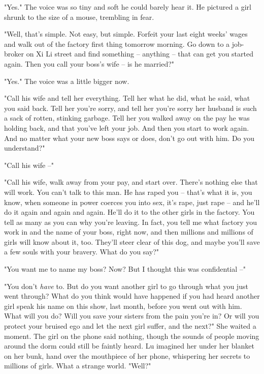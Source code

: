 "Yes." The voice was so tiny and soft he could barely hear it. He
pictured a girl shrunk to the size of a mouse, trembling in fear.

"Well, that's simple. Not easy, but simple. Forfeit your last eight
weeks' wages and walk out of the factory first thing tomorrow
morning. Go down to a job-broker on Xi Li street and find something
-- anything -- that can get you started again. Then you call your
boss's wife -- is he married?"

"Yes." The voice was a little bigger now.

"Call his wife and tell her everything. Tell her what he did, what
he said, what you said back. Tell her you're sorry, and tell her
you're sorry her husband is such a sack of rotten, stinking
garbage. Tell her you walked away on the pay he was holding back,
and that you've left your job. And then you start to work again.
And no matter what your new boss says or does, don't go out with
him. Do you understand?"

"Call his wife --"

"Call his wife, walk away from your pay, and start over. There's
nothing else that will work. You can't talk to this man. He has
raped you -- that's what it is, you know, when someone in power
coerces you into sex, it's rape, just rape -- and he'll do it again
and again and again. He'll do it to the other girls in the factory.
You tell as many as you can why you're leaving. In fact, you tell
me what factory you work in and the name of your boss, right now,
and then millions and millions of girls will know about it, too.
They'll steer clear of this dog, and maybe you'll save a few souls
with your bravery. What do you say?"

"You want me to name my boss? Now? But I thought this was
confidential --"

"You don't \emph{have} to. But do you want another girl to go
through what you just went through? What do you think would have
happened if you had heard another girl speak his name on this show,
last month, before you went out with him. What will you do? Will
you save your sisters from the pain you're in? Or will you protect
your bruised ego and let the next girl suffer, and the next?" She
waited a moment. The girl on the phone said nothing, though the
sounds of people moving around the dorm could still be faintly
heard. Lu imagined her under her blanket on her bunk, hand over the
mouthpiece of her phone, whispering her secrets to millions of
girls. What a strange world. "Well?"

